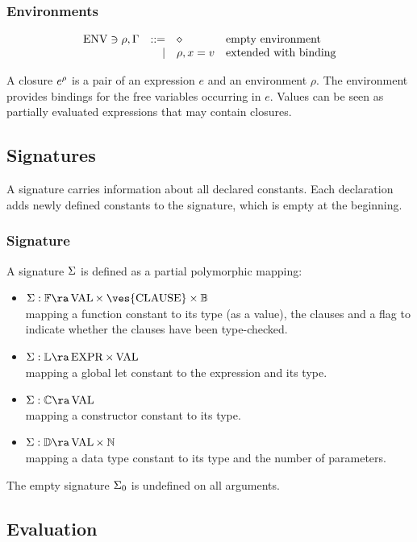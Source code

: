 \subsubsection{Environments}
\[
\begin{array}{lrll}
\operatorname{ENV} \ni \rho, \Gamma & ::= & \diamond & \mbox{empty environment}\\
& \mid & \rho,x = v & \mbox{extended with binding}\\
\end{array}
\]

A closure $e^{\rho}$ is a pair of an expression $e$ and an environment $\rho$.
The environment provides bindings for the free variables occurring in $e$.
Values can be seen as partially evaluated expressions that may contain closures.

\subsection{Signatures}

A signature carries information about all declared constants.
Each declaration adds newly defined constants to the signature, which is empty at the beginning.
\subsubsection{Signature}
A signature $\Sigma$ is defined as a partial polymorphic mapping:
\begin{itemize}
\item
$ \Sig : \cff \ra \Val \times \: \ves{\Clause} \times \cB $\\
mapping a function constant to its type (as a value), the clauses and a flag to indicate whether the clauses have been type-checked.
\item
$ \Sig : \cdd \ra \Expr \times \Val $\\
mapping a global let constant to the expression and its type. 
\item
$ \Sig : \ccc \ra \Val $\\
mapping a constructor constant to its type.
\item
$ \Sig : \cDD \ra \Val \times \: \cN $\\
mapping a data type constant to its type and the number of parameters.
\end{itemize}

\noindent The empty signature $\Sigma_0$ is undefined on all arguments.



\subsection{Evaluation}

